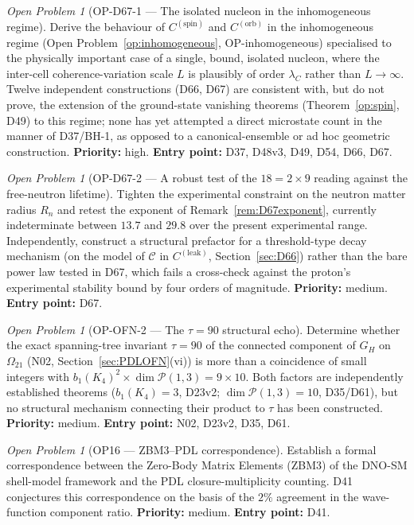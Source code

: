 \documentclass[11pt,a4paper]{article}
\theoremstyle{plain}
\theoremstyle{definition}
\theoremstyle{remark}
\newtheorem{openproblem}[theorem]{Open Problem}
\begin{document}
\begin{openproblem}[OP-D67-1 --- The isolated nucleon in the inhomogeneous regime]
\label{op:D67one}
Derive the behaviour of $C^{(\mathrm{spin})}$ and $C^{(\mathrm{orb})}$ in the inhomogeneous regime (Open Problem~\ref{op:inhomogeneous}, OP-inhomogeneous) specialised to the physically important case of a single, bound, isolated nucleon, where the inter-cell coherence-variation scale $L$ is plausibly of order $\lambda_C$ rather than $L\to\infty$. Twelve independent constructions (D66, D67) are consistent with, but do not prove, the extension of the ground-state vanishing theorems (Theorem~\ref{op:spin}, D49) to this regime; none has yet attempted a direct microstate count in the manner of D37/BH-1, as opposed to a canonical-ensemble or ad hoc geometric construction. \textbf{Priority:} high. \textbf{Entry point:} D37, D48v3, D49, D54, D66, D67.
\end{openproblem}

\begin{openproblem}[OP-D67-2 --- A robust test of the $18=2\times9$ reading against the free-neutron lifetime]
\label{op:D67two}
Tighten the experimental constraint on the neutron matter radius $R_n$ and retest the exponent of Remark~\ref{rem:D67exponent}, currently indeterminate between $13.7$ and $29.8$ over the present experimental range. Independently, construct a structural prefactor for a threshold-type decay mechanism (on the model of $\mathcal C$ in $C^{(\mathrm{leak})}$, Section~\ref{sec:D66}) rather than the bare power law tested in D67, which fails a cross-check against the proton's experimental stability bound by four orders of magnitude. \textbf{Priority:} medium. \textbf{Entry point:} D67.
\end{openproblem}

\begin{openproblem}[OP-OFN-2 --- The $\tau=90$ structural echo]
\label{op:OFN2}
Determine whether the exact spanning-tree invariant $\tau=90$ of the connected component of $G_H$ on $\Omega_{21}$ (N02, Section~\ref{sec:PDLOFN}(vi)) is more than a coincidence of small integers with $b_1(K_4)^2\times\dim\mathcal P(1,3)=9\times10$. Both factors are independently established theorems ($b_1(K_4)=3$, D23v2; $\dim\mathcal P(1,3)=10$, D35/D61), but no structural mechanism connecting their product to $\tau$ has been constructed. \textbf{Priority:} medium. \textbf{Entry point:} N02, D23v2, D35, D61.
\end{openproblem}

\begin{openproblem}[OP16 --- ZBM3--PDL correspondence]
\label{op:ZBM3}
Establish a formal correspondence between the Zero-Body Matrix Elements (ZBM3) of the DNO-SM shell-model framework and the PDL closure-multiplicity counting. D41 conjectures this correspondence on the basis of the $2\%$ agreement in the wave-function component ratio. \textbf{Priority:} medium. \textbf{Entry point:} D41.
\end{openproblem}
\end{document}
